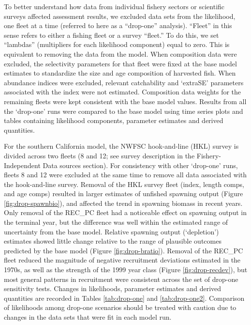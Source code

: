 \documentclass[11pt,
  english,
]{article}
\begin{document}
To better understand how data from individual fishery sectors or scientific surveys affected assessment results, we excluded data sets from the likelihood, one fleet at a time (referred to here as a ``drop-one'' analysis). ``Fleet'' in this sense refers to either a fishing fleet or a survey ``fleet.'' To do this, we set ``lambdas'' (multipliers for each likelihood component) equal to zero. This is equivalent to removing the data from the model. When composition data were excluded, the selectivity parameters for that fleet were fixed at the base model estimates to standardize the size and age composition of harvested fish. When abundance indices were excluded, relevant catchability and `extraSE' parameters associated with the index were not estimated. Composition data weights for the remaining fleets were kept consistent with the base model values. Results from all the `drop-one' runs were compared to the base model using time series plots and tables containing likelihood components, parameter estimates and derived quantities.

For the southern California model, the NWFSC hook-and-line (HKL) survey is divided across two fleets (8 and 12; see survey description in the Fishery-Independent Data sources section). For consistency with other `drop-one' runs, fleets 8 and 12 were excluded at the same time to remove all data associated with the hook-and-line survey. Removal of the HKL survey fleet (index, length comps, and age comps) resulted in larger estimates of unfished spawning output (Figure \ref{fig:drop-spawnbio}), and affected the trend in spawning biomass in recent years. Only removal of the REC\_PC fleet had a noticeable effect on spawning output in the terminal year, but the difference was well within the estimated range of uncertainty from the base model. Relative spawning output (`depletion') estimates showed little change relative to the range of plausible outcomes predicted by the base model (Figure \ref{fig:drop-bratio}). Removal of the REC\_PC fleet reduced the magnitude of negative recruitment deviations estimated in the 1970s, as well as the strength of the 1999 year class (Figure \ref{fig:drop-recdev}), but most general patterns in recruitment were consistent across the set of drop-one sensitivity tests. Changes in likelihoods, parameter estimates and derived quantities are recorded in Tables \ref{tab:drop-one} and \ref{tab:drop-one2}. Comparison of likelihoods among drop-one scenarios should be treated with caution due to changes in the data sets that were fit in each model run.
\end{document}
